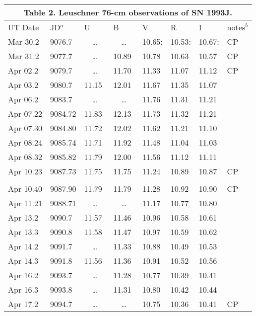 

\pagestyle{empty}

\def\ddd{\ \ \dots \ \ }


\begin{center}
\begin{tabular} {l l l l l l l l}
\multicolumn{8}{c}{Table 2. Leuschner 76-cm observations of SN 1993J.} \\ \hline \hline
UT Date & JD$^a$ & \hfil U \hfil  & \hfil  B\hfil   & \hfil   V \hfil  & \hfil  R \hfil  & \hfil  I \hfil  &  notes$^b$ \\ \hline
Mar 30.2  &9076.7  & \ddd &  \ddd & 10.65:& 10.53:& 10.67:&  CP \\
Mar 31.2  &9077.7  & \ddd & 10.89 & 10.78 & 10.63 & 10.57 &  CP \\
Apr 02.2  &9079.7  & \ddd & 11.70 & 11.33 & 11.07 & 11.12 &  CP \\
Apr 03.2  &9080.7  &11.15 & 12.01 & 11.67 & 11.35 & 11.07 &  \\
Apr 06.2  &9083.7  & \ddd &  \ddd & 11.76 & 11.31 & 11.21 &  \\
Apr 07.22 &9084.72 &11.83 & 12.13 & 11.73 & 11.32 & 11.21 &  \\
Apr 07.30 &9084.80 &11.72 & 12.02 & 11.62 & 11.21 & 11.10 &  \\
Apr 08.24 &9085.74 &11.71 & 11.92 & 11.48 & 11.04 & 11.03 &  \\
Apr 08.32 &9085.82 &11.79 & 12.00 & 11.56 & 11.12 & 11.11 &  \\
Apr 10.23 &9087.73 &11.75 & 11.75 & 11.24 & 10.89 & 10.87 &  CP \\
 \\
Apr 10.40 &9087.90 &11.79 & 11.79 & 11.28 & 10.92 & 10.90 &  CP \\
Apr 11.21 &9088.71 & \ddd &  \ddd & 11.17 & 10.77 & 10.80 &  \\
Apr 13.2  &9090.7  &11.57 & 11.46 & 10.96 & 10.58 & 10.61 &  \\
Apr 13.3  &9090.8  &11.58 & 11.47 & 10.97 & 10.59 & 10.62 &    \\
Apr 14.2  &9091.7  & \ddd & 11.33 & 10.88 & 10.49 & 10.53 &  \\
Apr 14.3  &9091.8  &11.56 & 11.36 & 10.91 & 10.52 & 10.56 &  \\
Apr 16.2  &9093.7  & \ddd & 11.28 & 10.77 & 10.39 & 10.41 &  \\
Apr 16.3  &9093.8  & \ddd & 11.31 & 10.80 & 10.42 & 10.44 &  \\
Apr 17.2  &9094.7  & \ddd &  \ddd & 10.75 & 10.36 & 10.41 &  CP \\

\end{tabular}
\end{center}
